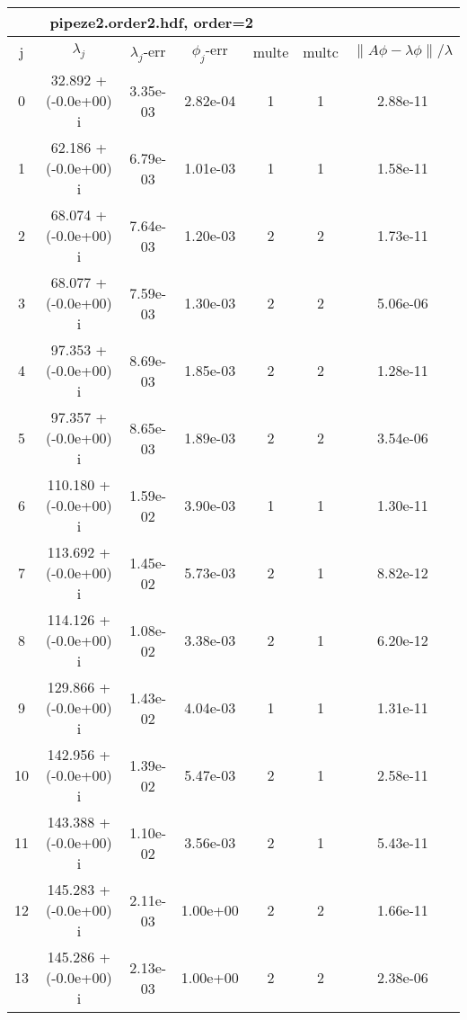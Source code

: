 \begin{table}[H]\tableFont %
\begin{center}
\begin{tabular}{|c|c|c|c|c|c|c|}  \hline
\multicolumn{5}{|c|}{pipeze2.order2.hdf, order=2} \\ \hline
   j    &         $\lambda_j$        & $\lambda_j$-err  & $\phi_j$-err  & multe & multc & $\| A\phi - \lambda\phi\|/\lambda$     \\ \hline
     0  &     32.892 + (-0.0e+00) i  &    3.35e-03      &   2.82e-04    &   1    &  1   &    2.88e-11 \\
     1  &     62.186 + (-0.0e+00) i  &    6.79e-03      &   1.01e-03    &   1    &  1   &    1.58e-11 \\
     2  &     68.074 + (-0.0e+00) i  &    7.64e-03      &   1.20e-03    &   2    &  2   &    1.73e-11 \\
     3  &     68.077 + (-0.0e+00) i  &    7.59e-03      &   1.30e-03    &   2    &  2   &    5.06e-06 \\
     4  &     97.353 + (-0.0e+00) i  &    8.69e-03      &   1.85e-03    &   2    &  2   &    1.28e-11 \\
     5  &     97.357 + (-0.0e+00) i  &    8.65e-03      &   1.89e-03    &   2    &  2   &    3.54e-06 \\
     6  &    110.180 + (-0.0e+00) i  &    1.59e-02      &   3.90e-03    &   1    &  1   &    1.30e-11 \\
     7  &    113.692 + (-0.0e+00) i  &    1.45e-02      &   5.73e-03    &   2    &  1   &    8.82e-12 \\
     8  &    114.126 + (-0.0e+00) i  &    1.08e-02      &   3.38e-03    &   2    &  1   &    6.20e-12 \\
     9  &    129.866 + (-0.0e+00) i  &    1.43e-02      &   4.04e-03    &   1    &  1   &    1.31e-11 \\
    10  &    142.956 + (-0.0e+00) i  &    1.39e-02      &   5.47e-03    &   2    &  1   &    2.58e-11 \\
    11  &    143.388 + (-0.0e+00) i  &    1.10e-02      &   3.56e-03    &   2    &  1   &    5.43e-11 \\
    12  &    145.283 + (-0.0e+00) i  &    2.11e-03      &   1.00e+00    &   2    &  2   &    1.66e-11 \\
    13  &    145.286 + (-0.0e+00) i  &    2.13e-03      &   1.00e+00    &   2    &  2   &    2.38e-06 \\

\end{tabular}
\end{center}
\end{table}
